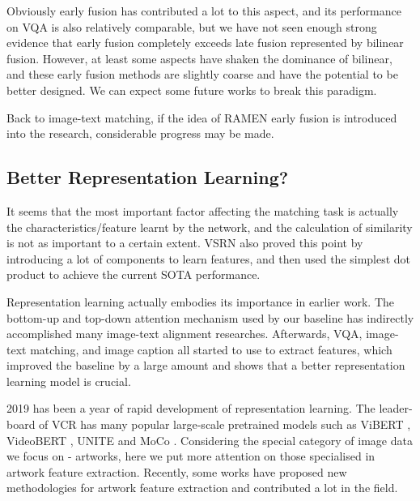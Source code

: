Obviously early fusion has contributed a lot to this aspect, and its performance on VQA is also relatively comparable, but we have not seen enough strong evidence that early fusion completely exceeds late fusion represented by bilinear fusion. However, at least some aspects have shaken the dominance of bilinear, and these early fusion methods are slightly coarse and have the potential to be better designed. We can expect some future works to break this paradigm.

Back to image-text matching, if the idea of RAMEN \cite{ramen} early fusion is introduced into the research, considerable progress may be made.

\subsection{Better Representation Learning?}

It seems that the most important factor affecting the matching task is actually the characteristics/feature learnt by the network, and the calculation of similarity is not as important to a certain extent. VSRN \cite{VSRN} also proved this point by introducing a lot of components to learn features, and then used the simplest dot product to achieve the current SOTA performance.

Representation learning actually embodies its importance in earlier work. The bottom-up and top-down \cite{bottomup} attention mechanism used by our baseline has indirectly accomplished many image-text alignment researches. Afterwards, VQA, image-text matching, and image caption all started to use \cite{bottomup} to extract features, which improved the baseline by a large amount and shows that a better representation learning model is crucial.

2019 has been a year of rapid development of representation learning. The leader-board of VCR \cite{zellers2019vcr} has many popular large-scale pretrained models such as ViBERT \cite{lu2019vilbert}, VideoBERT \cite{sun2019videobert}, UNITE \cite{chen2019uniter} and MoCo \cite{he2019momentum}. Considering the special category of image data we focus on - artworks, here we put more attention on those specialised in artwork feature extraction. Recently, some works \cite{TranslatingArtworks,parttowhole,Art2Real,tan2017artgan,shen2019discovering} have proposed new methodologies for artwork feature extraction and contributed a lot in the field. 



